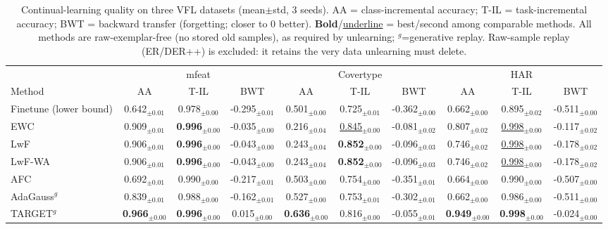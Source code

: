 \begin{table}[t]\centering\small
\caption{Continual-learning quality on three VFL datasets (mean$\pm$std, 3 seeds). AA = class-incremental accuracy; T-IL = task-incremental accuracy; BWT = backward transfer (forgetting; closer to 0 better). \textbf{Bold}/\underline{underline} = best/second among comparable methods. All methods are raw-exemplar-free (no stored old samples), as required by unlearning; $^{g}$=generative replay. Raw-sample replay (ER/DER++) is excluded: it retains the very data unlearning must delete.}
\begin{tabular}{lccccccccc}\toprule
 & \multicolumn{3}{c}{mfeat} & \multicolumn{3}{c}{Covertype} & \multicolumn{3}{c}{HAR} \\
\cmidrule(lr){2-4}\cmidrule(lr){5-7}\cmidrule(lr){8-10}
Method & AA & T-IL & BWT & AA & T-IL & BWT & AA & T-IL & BWT \\\midrule
Finetune (lower bound) & 0.642$_{\pm0.01}$ & 0.978$_{\pm0.00}$ & -0.295$_{\pm0.01}$ & 0.501$_{\pm0.00}$ & 0.725$_{\pm0.01}$ & -0.362$_{\pm0.00}$ & 0.662$_{\pm0.00}$ & 0.895$_{\pm0.02}$ & -0.511$_{\pm0.00}$ \\
\midrule
EWC & 0.909$_{\pm0.01}$ & \textbf{0.996}$_{\pm0.00}$ & -0.035$_{\pm0.00}$ & 0.216$_{\pm0.04}$ & \underline{0.845}$_{\pm0.00}$ & -0.081$_{\pm0.02}$ & 0.807$_{\pm0.02}$ & \underline{0.998}$_{\pm0.00}$ & -0.117$_{\pm0.02}$ \\
LwF & 0.906$_{\pm0.01}$ & \textbf{0.996}$_{\pm0.00}$ & -0.043$_{\pm0.00}$ & 0.243$_{\pm0.04}$ & \textbf{0.852}$_{\pm0.00}$ & -0.096$_{\pm0.03}$ & 0.746$_{\pm0.02}$ & \underline{0.998}$_{\pm0.00}$ & -0.178$_{\pm0.02}$ \\
LwF-WA & 0.906$_{\pm0.01}$ & \textbf{0.996}$_{\pm0.00}$ & -0.043$_{\pm0.00}$ & 0.243$_{\pm0.04}$ & \textbf{0.852}$_{\pm0.00}$ & -0.096$_{\pm0.03}$ & 0.746$_{\pm0.02}$ & \underline{0.998}$_{\pm0.00}$ & -0.178$_{\pm0.02}$ \\
AFC & 0.692$_{\pm0.01}$ & 0.990$_{\pm0.00}$ & -0.217$_{\pm0.01}$ & 0.503$_{\pm0.00}$ & 0.754$_{\pm0.00}$ & -0.351$_{\pm0.01}$ & 0.664$_{\pm0.00}$ & 0.990$_{\pm0.00}$ & -0.507$_{\pm0.00}$ \\
AdaGauss$^{g}$ & 0.839$_{\pm0.01}$ & 0.988$_{\pm0.00}$ & -0.162$_{\pm0.01}$ & 0.527$_{\pm0.00}$ & 0.753$_{\pm0.01}$ & -0.302$_{\pm0.01}$ & 0.662$_{\pm0.00}$ & 0.986$_{\pm0.00}$ & -0.511$_{\pm0.00}$ \\
TARGET$^{g}$ & \textbf{0.966}$_{\pm0.00}$ & \textbf{0.996}$_{\pm0.00}$ & 0.015$_{\pm0.00}$ & \textbf{0.636}$_{\pm0.00}$ & 0.816$_{\pm0.00}$ & -0.055$_{\pm0.01}$ & \textbf{0.949}$_{\pm0.00}$ & \textbf{0.998}$_{\pm0.00}$ & -0.024$_{\pm0.00}$ \\

\end{tabular}
\end{table}
